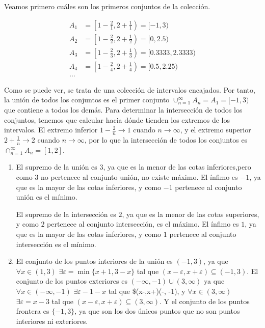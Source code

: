 \documentclass[
  spanish,
  a4paper,
]{scrreport}
\theoremstyle{definition}
\theoremstyle{remark}
\begin{document}
\begin{tcolorbox}[enhanced jigsaw, arc=.35mm, bottomrule=.15mm, bottomtitle=1mm, breakable, colback=white, colbacktitle=quarto-callout-tip-color!10!white, colframe=quarto-callout-tip-color-frame, coltitle=black, left=2mm, leftrule=.75mm, opacityback=0, opacitybacktitle=0.6, rightrule=.15mm, title=\textcolor{quarto-callout-tip-color}{\faLightbulb}\hspace{0.5em}{Solución}, titlerule=0mm, toprule=.15mm, toptitle=1mm]

Veamos primero cuáles son los primeros conjuntos de la colección.

\begin{align*}
A_1 &= \left[1-\frac{2}{1}, 2+\frac{1}{1}\right) = [-1,3)\\
A_2 &= \left[1-\frac{2}{2}, 2+\frac{1}{2}\right) = [0,2.5)\\
A_3 &= \left[1-\frac{2}{3}, 2+\frac{1}{3}\right) = [0.3333,2.3333)\\
A_4 &= \left[1-\frac{2}{4}, 2+\frac{1}{4}\right) = [0.5,2.25)\\
\ldots
\end{align*}

Como se puede ver, se trata de una colección de intervalos encajados.
Por tanto, la unión de todos los conjuntos es el primer conjunto
\(\cup_{n=1}^\infty A_n = A_1=[-1,3)\) que contiene a todos los demás.
Para determinar la intersección de todos los conjuntos, tenemos que
calcular hacia dónde tienden los extremos de los intervalos. El extremo
inferior \(1-\frac{2}{n}\to 1\) cuando \(n\to\infty\), y el extremo
superior \(2+\frac{1}{n}\to 2\) cuando \(n\to\infty\), por lo que la
intersección de todos los conjuntos es
\(\cap_{n=1}^\infty A_n = [1,2]\).

\begin{enumerate}
\def\labelenumi{\alph{enumi}.}
\item
  El supremo de la unión es \(3\), ya que es la menor de las cotas
  inferiores,pero como \(3\) no pertenece al conjunto unión, no existe
  máximo. El ínfimo es \(-1\), ya que es la mayor de las cotas
  inferiores, y como \(-1\) pertenece al conjunto unión es el mínimo.

  El supremo de la intersección es \(2\), ya que es la menor de las
  cotas superiores, y como \(2\) pertenece al conjunto intersección, es
  el máximo. El ínfimo es \(1\), ya que es la mayor de las cotas
  inferiores, y como \(1\) pertenece al conjunto intersección es el
  mínimo.
\item
  El conjunto de los puntos interiores de la unión es \((-1,3)\), ya que
  \(\forall x\in(1,3)\) \(\exists \varepsilon=\min\{x+1,3-x\}\) tal que
  \((x-\varepsilon, x+\varepsilon)\subseteq (-1,3)\). El conjunto de los
  puntos exteriores es \((-\infty,-1)\cup(3,\infty)\) ya que
  \(\forall x\in (-\infty, -1)\) \(\exists \varepsilon -1-x\) tal que
  \$(x-\varepsilon,x+\varepsilon)\subseteq (-\infty, -1), y
  \(\forall x\in (3,\infty)\) \(\exists \varepsilon = x-3\) tal que
  \((x-\varepsilon,x+\varepsilon)\subseteq (3,\infty)\). Y el conjunto
  de los puntos frontera es \(\{-1,3\}\), ya que son los dos únicos
  puntos que no son puntos interiores ni exteriores.


\end{enumerate}
\end{tcolorbox}
\end{document}
